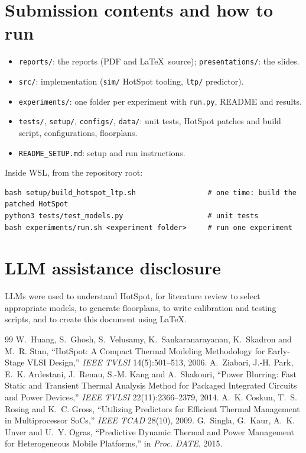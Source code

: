 \documentclass[11pt,a4paper]{article}
\begin{document}
\section{Submission contents and how to run}
\begin{itemize}
  \item \texttt{reports/}: the reports (PDF and \LaTeX\ source); \texttt{presentations/}: the slides.
  \item \texttt{src/}: implementation (\texttt{sim/} HotSpot tooling, \texttt{ltp/} predictor).
  \item \texttt{experiments/}: one folder per experiment with \texttt{run.py}, README and results.
  \item \texttt{tests/}, \texttt{setup/}, \texttt{configs/}, \texttt{data/}: unit tests, HotSpot
        patches and build script, configurations, floorplans.
  \item \texttt{README\_SETUP.md}: setup and run instructions.
\end{itemize}
Inside WSL, from the repository root:
{\small\begin{verbatim}
bash setup/build_hotspot_ltp.sh                 # one time: build the patched HotSpot
python3 tests/test_models.py                    # unit tests
bash experiments/run.sh <experiment folder>     # run one experiment
\end{verbatim}}

\section{LLM assistance disclosure}
LLMs were used to understand HotSpot, for literature review to select appropriate models, to
generate floorplans, to write calibration and testing scripts, and to create this document using
\LaTeX.

\begin{thebibliography}{99}\small
\setlength{\itemsep}{0pt}
 W.~Huang, S.~Ghosh, S.~Velusamy, K.~Sankaranarayanan, K.~Skadron and
  M.~R. Stan, ``HotSpot: A Compact Thermal Modeling Methodology for Early-Stage VLSI Design,''
  \emph{IEEE TVLSI} 14(5):501--513, 2006.
 A.~Ziabari, J.-H. Park, E.~K. Ardestani, J.~Renau, S.-M. Kang and
  A.~Shakouri, ``Power Blurring: Fast Static and Transient Thermal Analysis Method for Packaged
  Integrated Circuits and Power Devices,'' \emph{IEEE TVLSI} 22(11):2366--2379, 2014.
 A.~K. Coskun, T.~S. Rosing and K.~C. Gross, ``Utilizing Predictors for
  Efficient Thermal Management in Multiprocessor SoCs,'' \emph{IEEE TCAD} 28(10), 2009.
 G.~Singla, G.~Kaur, A.~K. Unver and U.~Y. Ogras, ``Predictive Dynamic Thermal
  and Power Management for Heterogeneous Mobile Platforms,'' in \emph{Proc. DATE}, 2015.
\end{thebibliography}
\end{document}

